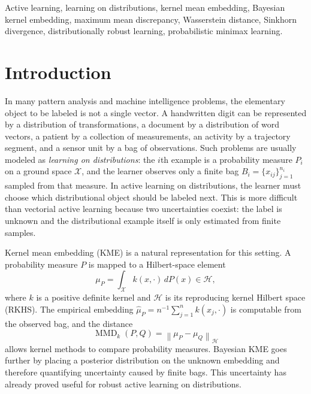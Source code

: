 \documentclass[10pt,journal]{IEEEtran}
\DeclareMathOperator{\MMD}{MMD}
\newcommand{\Xcal}{\mathcal{X}}
\newcommand{\Hcal}{\mathcal{H}}
\newcommand{\wh}{\widehat}
\newcommand{\norm}[1]{\left\lVert #1 \right\rVert}
\begin{document}
\begin{IEEEkeywords}
Active learning, learning on distributions, kernel mean embedding, Bayesian kernel embedding, maximum mean discrepancy, Wasserstein distance, Sinkhorn divergence, distributionally robust learning, probabilistic minimax learning.
\end{IEEEkeywords}

\section{Introduction}
\label{sec:introduction}

In many pattern analysis and machine intelligence problems, the elementary object to be labeled is not a single vector. A handwritten digit can be represented by a distribution of transformations, a document by a distribution of word vectors, a patient by a collection of measurements, an activity by a trajectory segment, and a sensor unit by a bag of observations. Such problems are usually modeled as \emph{learning on distributions}: the $i$th example is a probability measure $P_i$ on a ground space $\Xcal$, and the learner observes only a finite bag $B_i=\{x_{ij}\}_{j=1}^{n_i}$ sampled from that measure. In active learning on distributions, the learner must choose which distributional object should be labeled next. This is more difficult than vectorial active learning because two uncertainties coexist: the label is unknown and the distributional example itself is only estimated from finite samples.

Kernel mean embedding (KME) is a natural representation for this setting. A probability measure $P$ is mapped to a Hilbert-space element
\begin{equation}
    \mu_P = \int_{\Xcal} k(x,\cdot)\,dP(x) \in \Hcal,
\end{equation}
where $k$ is a positive definite kernel and $\Hcal$ is its reproducing kernel Hilbert space (RKHS). The empirical embedding $\wh\mu_P=n^{-1}\sum_{j=1}^{n}k(x_j,\cdot)$ is computable from the observed bag, and the distance
\begin{equation}
    \MMD_k(P,Q)=\norm{\mu_P-\mu_Q}_{\Hcal}
\end{equation}
allows kernel methods to compare probability measures. Bayesian KME goes further by placing a posterior distribution on the unknown embedding and therefore quantifying uncertainty caused by finite bags. This uncertainty has already proved useful for robust active learning on distributions.
\end{document}
